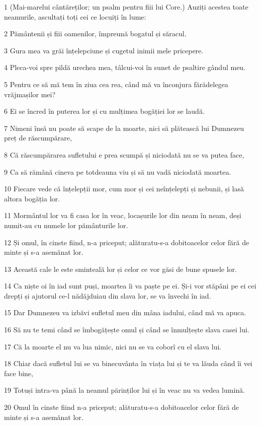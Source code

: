 \par 1 (Mai-marelui cântăreților; un psalm pentru fiii lui Core.) Auziți acestea toate neamurile, ascultați toți cei ce locuiți în lume:
\par 2 Pământenii și fiii oamenilor, împreună bogatul și săracul.
\par 3 Gura mea va grăi înțelepciune și cugetul inimii mele pricepere.
\par 4 Pleca-voi spre pildă urechea mea, tâlcui-voi în sunet de psaltire gândul meu.
\par 5 Pentru ce să mă tem în ziua cea rea, când mă va înconjura fărădelegea vrăjmașilor mei?
\par 6 Ei se încred în puterea lor și cu mulțimea bogăției lor se laudă.
\par 7 Nimeni însă nu poate să scape de la moarte, nici să plătească lui Dumnezeu preț de răscumpărare,
\par 8 Că răscumpărarea sufletului e prea scumpă și niciodată nu se va putea face,
\par 9 Ca să rămână cineva pe totdeauna viu și să nu vadă niciodată moartea.
\par 10 Fiecare vede că înțelepții mor, cum mor și cei neînțelepți și nebunii, și lasă altora bogăția lor.
\par 11 Mormântul lor va fi casa lor în veac, locașurile lor din neam în neam, deși numit-au cu numele lor pământurile lor.
\par 12 Și omul, în cinste fiind, n-a priceput; alăturatu-s-a dobitoacelor celor fără de minte și s-a asemănat lor.
\par 13 Această cale le este sminteală lor și celor ce vor găsi de bune spusele lor.
\par 14 Ca niște oi în iad sunt puși, moartea îi va paște pe ei. Și-i vor stăpâni pe ei cei drepți și ajutorul ce-l nădăjduiau din slava lor, se va învechi în iad.
\par 15 Dar Dumnezeu va izbăvi sufletul meu din mâna iadului, când mă va apuca.
\par 16 Să nu te temi când se îmbogățește omul și când se înmulțește slava casei lui.
\par 17 Că la moarte el nu va lua nimic, nici nu se va coborî cu el slava lui.
\par 18 Chiar dacă sufletul lui se va binecuvânta în viața lui și te va lăuda când îi vei face bine,
\par 19 Totuși intra-va până la neamul părinților lui și în veac nu va vedea lumină.
\par 20 Omul în cinste fiind n-a priceput; alăturatu-s-a dobitoacelor celor fără de minte și s-a asemănat lor.

